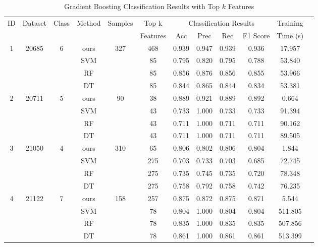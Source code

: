 \begin{table}[htbp]
  \centering
  \caption{Gradient Boosting Classification Results with Top $k$ Features}
  \label{tab:gb_results}
  \scriptsize
  \begin{tabular}{cccccccccccc}
    \toprule
    ID & Dataset & Class & Method & Samples & \multicolumn{1}{c}{Top k} & \multicolumn{4}{c}{Classification Results} & {Training} \\
    \cmidrule(lr){7-10} 
        &         &       &         &   & Features & Acc & Prec & Rec & F1 Score & Time (s)  \\
  \midrule
        1  & 20685 & 6 & ours & 327 & 468 & 0.939 & 0.947 & 0.939 & 0.936 & 17.957 \\
           &       &   & SVM  &     & 85  & 0.795 & 0.820 & 0.795 & 0.788 & 53.840 \\
           &       &   & RF   &     & 85  & 0.856 & 0.876 & 0.856 & 0.855 & 53.966 \\
           &       &   & DT   &     & 85  & 0.844 & 0.865 & 0.844 & 0.834 & 53.381 \\
        \midrule
        2  & 20711 & 5 & ours & 90  & 38  & 0.889 & 0.921 & 0.889 & 0.892 & 0.664 \\
           &       &   & SVM  &     & 43  & 0.733 & 1.000 & 0.733 & 0.733 & 91.394 \\
           &       &   & RF   &     & 43  & 0.711 & 1.000 & 0.711 & 0.711 & 90.162 \\
           &       &   & DT   &     & 43  & 0.711 & 1.000 & 0.711 & 0.711 & 89.505 \\
        \midrule
        3  & 21050 & 4 & ours & 310 & 65  & 0.806 & 0.802 & 0.806 & 0.804 & 1.844 \\
           &       &   & SVM  &     & 275 & 0.703 & 0.733 & 0.703 & 0.685 & 72.745 \\
           &       &   & RF   &     & 275 & 0.735 & 0.745 & 0.735 & 0.720 & 78.348 \\
           &       &   & DT   &     & 275 & 0.758 & 0.792 & 0.758 & 0.742 & 76.235 \\
        \midrule
        4  & 21122 & 7 & ours & 158 & 257 & 0.875 & 0.872 & 0.875 & 0.871 & 5.544 \\
           &       &   & SVM  &     & 78  & 0.804 & 1.000 & 0.804 & 0.804 & 511.805 \\
           &       &   & RF   &     & 78  & 0.835 & 1.000 & 0.835 & 0.835 & 507.856 \\
           &       &   & DT   &     & 78  & 0.861 & 1.000 & 0.861 & 0.861 & 513.399 \\

\end{tabular}
\end{table}
